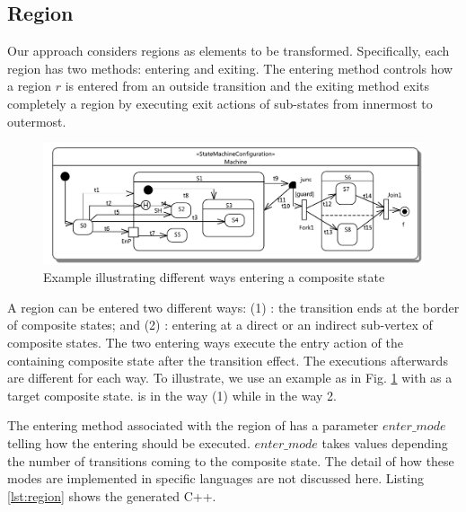 \subsection{Region}
\label{subsubsec:region-trans}
Our approach considers regions as elements to be transformed. 
Specifically, each region has two methods: entering and exiting. 
The entering method controls how a region $r$ is entered from an outside transition and the exiting method exits completely a region by executing exit actions of sub-states from innermost to outermost.

\begin{figure}
	\hspace*{-1.2cm}  
	\centering
	\includegraphics[clip, trim=0.2cm 0.2cm 0.2cm 0.2cm, width=1.0\columnwidth + 1.2cm]{figures/EnteringStateExample.pdf}
	\caption{Example illustrating different ways entering a composite state} 
	\label{fig:entering}
\end{figure}

A region can be entered two different ways: (1) : the transition ends at the border of composite states; and (2) : entering at a direct or an indirect sub-vertex of composite states.
The two entering ways execute the entry action of the containing composite state after the transition effect. 
The executions afterwards are different for each way. 
To illustrate, we use an example as in Fig. \ref{fig:entering} with  as a target composite state. 
 is in the way (1) while  in the way 2. 

The entering method associated with the region of  has a parameter $enter\_mode$ telling how the entering should be executed. 
$enter\_mode$ takes values depending the number of transitions coming to the composite state. %
The detail of how these modes are implemented in specific languages are not discussed here.
Listing \ref{lst:region} shows the generated C++.

